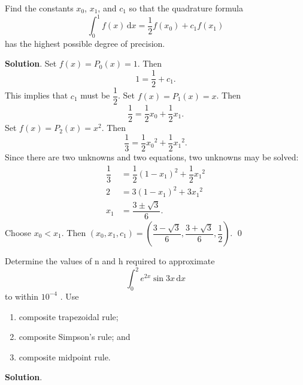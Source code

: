\documentclass[11pt]{article}
\theoremstyle{break}
\newcommand{\ddi}{\text{$\,$d}}
\numberwithin{equation}{theorem}
\begin{document}
\newpage
\begin{problem}\label{problem 7} %
    Find the constants $x_0$, $x_1$, and $c_1$ so that the quadrature formula $$\int_0^1f(x)\ddi x=\dfrac{1}{2}f(x_0)+c_1f(x_1)$$ has the highest possible degree of precision.
\end{problem}
\textbf{Solution}. Set $f(x)=P_0(x)=1$. Then $$1=\dfrac{1}{2}+c_1.$$ This implies that $c_1$ must be $\dfrac{1}{2}$. Set $f(x)=P_1(x)=x$. Then $$\dfrac{1}{2}=\dfrac{1}{2}x_0+\dfrac{1}{2}x_1.$$ Set $f(x)=P_2(x)=x^2$. Then $$\dfrac{1}{3}=\dfrac{1}{2}{x_0}^2+\dfrac{1}{2}{x_1}^2.$$ Since there are two unknowns and two equations, two unknowns may be solved: \begin{align*}
    \dfrac{1}{3}&=\dfrac{1}{2}\left(1-x_1\right)^2+\dfrac{1}{2}{x_1}^2\\
    2&=3(1-x_1)^2+3{x_1}^2\\
    x_1&=\dfrac{3\pm\sqrt{3}}{6}.
\end{align*}
Choose $x_0<x_1$. Then $(x_0, x_1, c_1)=\left(\dfrac{3-\sqrt{3}}{6}, \dfrac{3+\sqrt{3}}{6}, \dfrac{1}{2}\right)$. \qed


\newpage
\begin{problem}\label{problem 8} %
    Determine the values of n and h required to approximate $$\int_{0}^{2}e^{2x}\sin 3x\ddi x$$ to within $10^{-4}$ . Use
    \begin{enumerate}
        \item composite trapezoidal rule;
        \item composite Simpson's rule; and
        \item composite midpoint rule.
    \end{enumerate}
\end{problem}
\textbf{Solution}. 
\end{document}
